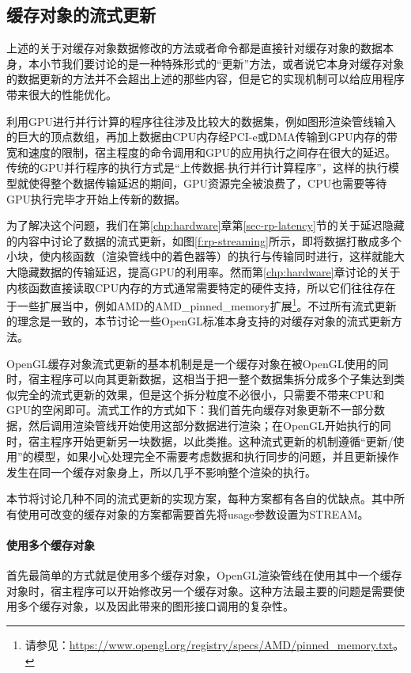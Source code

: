 \subsection{缓存对象的流式更新}
上述的关于对缓存对象数据修改的方法或者命令都是直接针对缓存对象的数据本身，本小节我们要讨论的是一种特殊形式的“更新”方法，或者说它本身对缓存对象的数据更新的方法并不会超出上述的那些内容，但是它的实现机制可以给应用程序带来很大的性能优化。

利用GPU进行并行计算的程序往往涉及比较大的数据集，例如图形渲染管线输入的巨大的顶点数组，再加上数据由CPU内存经PCI-e或DMA传输到GPU内存的带宽和速度的限制，宿主程度的命令调用和GPU的应用执行之间存在很大的延迟。传统的GPU并行程序的执行方式是“上传数据-执行并行计算程序”，这样的执行模型就使得整个数据传输延迟的期间，GPU资源完全被浪费了，CPU也需要等待GPU执行完毕才开始上传新的数据。

为了解决这个问题，我们在第\ref{chp:hardware}章第\ref{sec-rp-latency}节的关于延迟隐藏的内容中讨论了数据的流式更新，如图\ref{f:rp-streaming}所示，即将数据打散成多个小块，使内核函数（渲染管线中的着色器等）的执行与传输同时进行，这样就能大大隐藏数据的传输延迟，提高GPU的利用率。然而第\ref{chp:hardware}章讨论的关于内核函数直接读取CPU内存的方式通常需要特定的硬件支持，所以它们往往存在于一些扩展当中，例如AMD的AMD\_pinned\_memory扩展\footnote{请参见：\url{https://www.opengl.org/registry/specs/AMD/pinned_memory.txt}。}。不过所有流式更新的理念是一致的，本节讨论一些OpenGL标准本身支持的对缓存对象的流式更新方法。

OpenGL缓存对象流式更新的基本机制是是一个缓存对象在被OpenGL使用的同时，宿主程序可以向其更新数据，这相当于把一整个数据集拆分成多个子集达到类似完全的流式更新的效果，但是这个拆分粒度不必很小，只需要不带来CPU和GPU的空闲即可。流式工作的方式如下：我们首先向缓存对象更新不一部分数据，然后调用渲染管线开始使用这部分数据进行渲染；在OpenGL开始执行的同时，宿主程序开始更新另一块数据，以此类推。这种流式更新的机制遵循“更新/使用”的模型，如果小心处理完全不需要考虑数据和执行同步的问题，并且更新操作发生在同一个缓存对象身上，所以几乎不影响整个渲染的执行。

本节将讨论几种不同的流式更新的实现方案，每种方案都有各自的优缺点。其中所有使用可改变的缓存对象的方案都需要首先将usage参数设置为STREAM。


\paragraph{使用多个缓存对象}
首先最简单的方式就是使用多个缓存对象，OpenGL渲染管线在使用其中一个缓存对象时，宿主程序可以开始修改另一个缓存对象。这种方法最主要的问题是需要使用多个缓存对象，以及因此带来的图形接口调用的复杂性。



